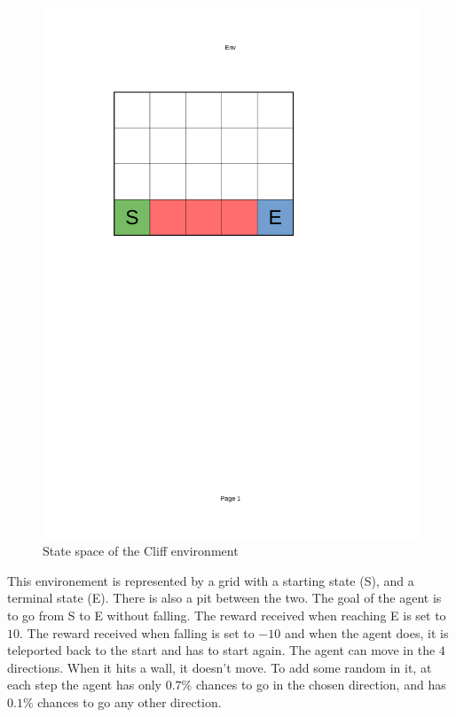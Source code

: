 \begin{figure}[!ht]
    \centering
\includegraphics[page=1, trim = 40mm 160mm 70mm 45mm, clip, height=0.2\textheight]{figures/personal_work/policies.pdf}
\caption{State space of the Cliff environment}
\end{figure}

This environement is represented by a grid with a starting state (S), and a terminal state (E). There is also a pit between the two. The goal of the agent is to go from S to E without falling. The reward received when reaching E is set to $10$. The reward received when falling is set to $-10$ and when the agent does, it is teleported back to the start and has to start again. The agent can move in the $4$ directions. When it hits a wall, it doesn’t move. To add some random in it, at each step the agent has only $0.7\%$ chances to go in the chosen direction, and has $0.1\%$ chances to go any other direction.

